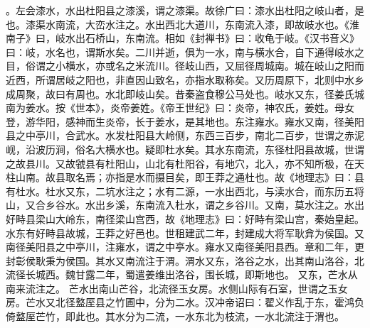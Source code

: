 \documentclass[12pt,UTF8]{ctexbook}
\begin{document}
。左会漆水，水出杜阳县之漆溪，谓之漆渠。故徐广曰：漆水出杜阳之岐山者，是也。漆渠水南流，大峦水注之。水出西北大道川，东南流入漆，即故岐水也。《淮南子》曰，岐水出石桥山，东南流。相如《封禅书》曰：收龟于岐。《汉书音义》曰：岐，水名也，谓斯水矣。二川并逝，俱为一水，南与横水合，自下通得岐水之目，俗谓之小横水，亦或名之米流川。径岐山西，又屈径周城南。城在岐山之阳而近西，所谓居岐之阳也，非直因山致名，亦指水取称矣。又历周原下，北则中水乡成周聚，故曰有周也。水北即岐山矣。昔秦盗食穆公马处也。岐水又东，径姜氏城南为姜水。按《世本》，炎帝姜姓。《帝王世纪》曰：炎帝，神农氏，姜姓。母女登，游华阳，感神而生炎帝，长于姜水，是其地也。东注雍水。雍水又南，径美阳县之中亭川，合武水。水发杜阳县大岭侧，东西三百步，南北二百步，世谓之赤泥岘，沿波历涧，俗名大横水也。疑即杜水矣。其水东南流，东径杜阳县故城，世谓之故县川。又故虢县有杜阳山，山北有杜阳谷，有地穴，北入，亦不知所极，在天柱山南。故县取名焉；亦指是水而摄目矣，即王莽之通杜也。故《地理志》曰：县有杜水。杜水又东，二坑水注之；水有二源，一水出西北，与渎水合，而东历五将山，又合乡谷水。水出乡溪，东南流入杜水，谓之乡谷川。又南，莫水注之。水出好畤县梁山大岭东，南径梁山宫西，故《地理志》曰：好畤有梁山宫，秦始皇起。水东有好畤县故城，王莽之好邑也。世租建武二年，封建成大将军耿弇为侯国。又南径美阳县之中亭川，注雍水，谓之中亭水。雍水又南径美阳县西。章和二年，更封彰侯耿秉为侯国。其水又南流注于渭。渭水又东，洛谷之水，出其南山洛谷，北流径长城西。魏甘露二年，蜀遣姜维出洛谷，围长城，即斯地也。
又东，芒水从南来流注之。
芒水出南山芒谷，北流径玉女房。水侧山际有石室，世谓之玉女房。芒水又北径盩厔县之竹圃中，分为二水。汉冲帝诏曰：翟义作乱于东，霍鸿负倚盩厔芒竹，即此也。其水分为二流，一水东北为枝流，一水北流注于渭也。
\end{document}
